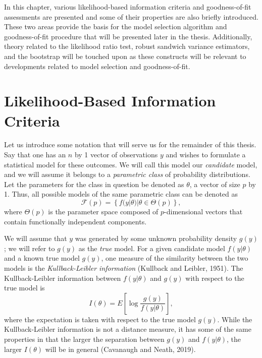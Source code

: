 \doublespace
{}
		In this chapter, various likelihood-based information criteria and goodness-of-fit assessments are presented and some of their properties are also briefly introduced.
		These two areas provide the basis for the model selection algorithm and goodness-of-fit procedure that will be presented later in the thesis. Additionally, theory
		related to the likelihood ratio test, robust sandwich variance estimators, and the bootstrap will be touched upon as these constructs will be relevant to developments
		related to model selection and goodness-of-fit.
		
		\section{Likelihood-Based Information Criteria}

		Let us introduce some notation that will serve us for the remainder of this thesis. Say that one has an $n$ by 1  vector of observations $y$ and wishes to formulate a
		statistical model for these outcomes. We will call this model our \textit{candidate} model, and we will assume it belongs to a \textit{parametric class} of probability distributions.
		Let the parameters for the class in question be denoted as $\theta$, a vector of size $p$ by 1. Thus, all possible models of the same parametric class can be denoted
		as
		\begin{equation*}
			\mathcal{F}(p) = \left\{ f(y|\theta) | \theta \in \Theta(p) \right\} ,
		\end{equation*}
		where $\Theta(p)$ is the parameter space composed of $p$-dimensional vectors that contain functionally independent components.

		We will assume that $y$ was generated by some unknown probability density $g(y)$; we will refer to $g(y)$ as the \textit{true} model. For a given candidate model $f(y|\theta)$
		and a known true model $g(y)$, one measure of the similarity between the two models is the \textit{Kullback-Leibler information} (Kullback and Leibler, 1951). The Kullback-Leibler
		information between $f(y|\theta)$ and $g(y)$ with respect to the true model is
		\begin{equation*}
			I(\theta) = E \left[ \log \frac{g(y)}{f(y|\theta)} \right],
		\end{equation*}
		where the expectation is taken with respect to the true model $g(y)$. While the Kullback-Leibler information is not a distance measure, it has some of the same properties in
		that the larger the separation between $g(y)$ and $f(y|\theta)$, the larger $I(\theta)$ will be in general (Cavanaugh and Neath, 2019).
		
